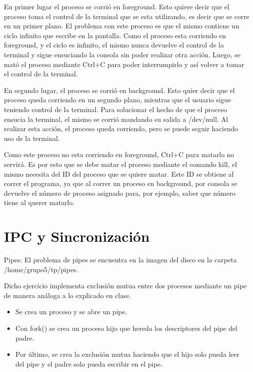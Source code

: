 \documentclass[a4paper, 12pt]{article}
\begin{document}
\bigskip

En primer lugar el proceso se corri\'o en foreground. Esto quiere decir que el proceso toma el control de la terminal que se esta utilizando, es decir que se corre en un primer plano. El problema con este proceso es que el mismo contiene un ciclo infinito que escribe en la pantalla. Como el proceso esta corriendo en foreground, y el ciclo es infinito, el mismo nunca devuelve el control de la terminal y sigue ensuciando la consola sin poder realizar otra acci\'on. Luego, se mat\'o el proceso mediante Ctrl+C para poder interrumpirlo y as\'i volver a tomar el control de la terminal.

En segundo lugar, el proceso se corri\'o en background. Esto quier decir que el proceso queda corriendo en un segundo plano, mientras que el usuario sigue teniendo control de la terminal. Para solucionar el hecho de que el proceso ensucia la terminal, el mismo se corri\'o mandando su salida a /dev/null. Al realizar esta acci\'on, el proceso queda corriendo, pero se puede seguir haciendo uso de la terminal. 

Como este proceso no esta corriendo en foreground, Ctrl+C para matarlo no servir\'a. Es por esto que se debe matar el proceso mediante el comando kill, el mismo necesita del ID del proceso que se quiere matar. Este ID se obtiene al correr el programa, ya que al correr un proceso en background, por consola se devuelve el n\'umero de proceso asignado para, por ejemplo, saber que n\'umero tiene al querer matarlo.

\section*{IPC y Sincronizaci\'on}

Pipes: El problema de pipes se encuentra en la imagen del disco en la carpeta /home/grupo5/tp/pipes.

Dicho ejercicio implementa exclusi\'on mutua entre dos procesos mediante un pipe de manera an\'aloga a lo explicado en clase.
\begin{itemize}
\item Se crea un proceso y se abre un pipe.
\item Con fork() se crea un proceso hijo que hereda los descriptores del pipe del padre.
\item Por \'ultimo, se crea la exclusi\'on mutua haciendo que el hijo solo pueda leer del pipe y el padre solo pueda escribir en el pipe.
\end{itemize}
\end{document}
